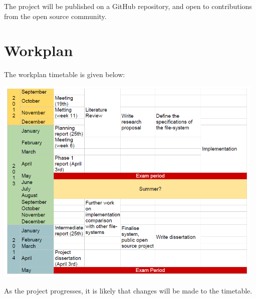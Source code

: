 \documentclass[8pt,a4paper]{article}
\begin{document}
The project will be published on a GitHub \cite{github} repository, and open to contributions from the open source community.

\section{Workplan}

The workplan timetable is given below:

\begin{center}
\includegraphics[width=13cm]{timetable.png}
\end{center}

As the project progresses, it is likely that changes will be made to the timetable.
\end{document}
